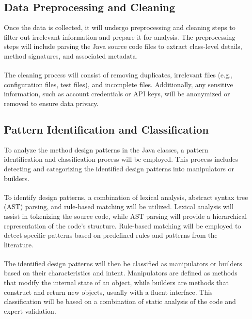 \documentclass[draft]{article}
\begin{document}
\subsection{Data Preprocessing and Cleaning}
Once the data is collected, it will undergo preprocessing and cleaning steps to filter out irrelevant information and prepare it for analysis. The preprocessing steps will include parsing the Java source code files to extract class-level details, method signatures, and associated metadata.\\
~\\
The cleaning process will consist of removing duplicates, irrelevant files (e.g., configuration files, test files), and incomplete files. Additionally, any sensitive information, such as account credentials or API keys, will be anonymized or removed to ensure data privacy.
\subsection{Pattern Identification and Classification}
To analyze the method design patterns in the Java classes, a pattern identification and classification process will be employed. This process includes detecting and categorizing the identified design patterns into manipulators or builders.\\
~\\
To identify design patterns, a combination of lexical analysis, abstract syntax tree (AST) parsing, and rule-based matching will be utilized. Lexical analysis will assist in tokenizing the source code, while AST parsing will provide a hierarchical representation of the code's structure. Rule-based matching will be employed to detect specific patterns based on predefined rules and patterns from the literature.\\
~\\
The identified design patterns will then be classified as manipulators or builders based on their characteristics and intent. Manipulators are defined as methods that modify the internal state of an object, while builders are methods that construct and return new objects, usually with a fluent interface. This classification will be based on a combination of static analysis of the code and expert validation.
\end{document}
